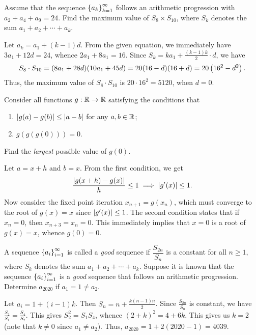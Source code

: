 \begin{question}[5120]\label{A::2020-O-1-13}
    Assume that the sequence $\left\lbrace a_k \right\rbrace_{k=1}^\infty$ follows an arithmetic progression with $a_2 + a_4 + a_9 = 24$. Find the maximum value of $S_8 \times S_{10}$, where $S_k$ denotes the sum $a_1 + a_2 + \cdots + a_k$.
\end{question}

Let $a_k = a_1 + (k-1)d$. From the given equation, we immediately have $3a_1 + 12d = 24$, whence $2a_1 + 8a_1 = 16$. Since $S_k = ka_1 + \frac{(k-1)k}2 \cdot d$, we have \[S_8 \cdot S_{10} = (8a_1 + 28d)(10a_1 + 45d) = 20(16 - d)(16 + d) = 20\left( 16^2 - d^2 \right).\] Thus, the maximum value of $S_8 \cdot S_{10}$ is $20 \cdot 16^2 = 5120$, when $d = 0$.

\begin{question}[0]\label{A::2020-O-1-14}
    Consider all functions $g : \mathbb{R} \to \mathbb{R}$ satisfying the conditions that
    \begin{enumerate}
    \item $\left\lvert g(a) - g(b) \right\rvert \leq \left\lvert a - b \right\rvert$ for any $a, b \in \mathbb{R}$;
    \item $g(g(g(0))) = 0$.
    \end{enumerate}
    Find the \textit{largest} possible value of $g(0)$.
\end{question}

Let $a = x+h$ and $b = x$. From the first condition, we get \[\frac{\left\lvert g(x+h) - g(x) \right\rvert}{h} \leq 1 \implies \left\lvert g'(x) \right\rvert \leq 1.\] Now consider the fixed point iteration $x_{n+1} = g(x_n)$, which must converge to the root of $g(x) = x$ since $\left\lvert g'(x) \right\rvert \leq 1$. The second condition states that if $x_n = 0$, then $x_{n+3} = x_n = 0$. This immediately implies that $x = 0$ is a root of $g(x) = x$, whence $g(0) = 0$.

\begin{question}[4039]\label{A::2020-O-1-15}
    A sequence $\left\lbrace a_i \right\rbrace_{i=1}^\infty$ is called a \textit{good} sequence if $\dfrac{S_{2n}}{S_n}$ is a constant for all $n \geq 1$, where $S_k$ denotes the sum $a_1 + a_2 + \cdots + a_k$. Suppose it is known that the sequence $\left\lbrace a_i \right\rbrace_{i = 1}^\infty$ is a \textit{good} sequence that follows an arithmetic progression. Determine $a_{2020}$ if $a_1 = 1 \neq a_2$.
\end{question}

Let $a_i = 1 + (i-1)k$. Then $S_n = n + \frac{k(n-1)n}{2}$. Since $\frac{S_{2n}}{S_n}$ is constant, we have $\frac{S_2}{S_1} = \frac{S_4}{S_2}$. This gives $S_2^2 = S_1 S_4$, whence $(2+k)^2 = 4 + 6k$. This gives us $k = 2$ (note that $k \neq 0$ since $a_1 \neq a_2$). Thus, $a_{2020} = 1 + 2(2020-1) = 4039$.

